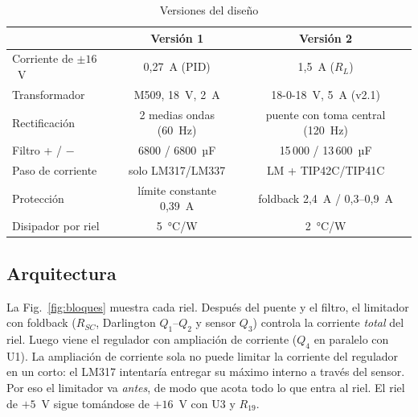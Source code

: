 \documentclass[conference]{IEEEtran}
\begin{document}
\begin{table}[htbp]
\caption{Versiones del diseño}
\label{tab:versiones}
\centering
\scriptsize\setlength{\tabcolsep}{3pt}
\begin{tabular}{@{}lcc@{}}
\toprule
 & Versión 1 & Versión 2 \\
\midrule
Corriente de $\pm16$~V & 0,27~A (PID) & 1,5~A ($R_L$) \\
Transformador & M509, 18~V, 2~A & 18-0-18~V, 5~A (v2.1) \\
Rectificación & 2 medias ondas (60~Hz) & puente con toma central (120~Hz) \\
Filtro + / $-$ & 6800 / 6800~µF & 15\,000 / 13\,600~µF \\
Paso de corriente & solo LM317/LM337 & LM + TIP42C/TIP41C \\
Protección & límite constante 0,39~A & foldback 2,4~A / 0,3--0,9~A \\
Disipador por riel & 5~°C/W & 2~°C/W \\
\bottomrule
\end{tabular}
\end{table}

\subsection{Arquitectura}
La Fig.~\ref{fig:bloques} muestra cada riel. Después del puente y el filtro, el limitador con foldback ($R_{SC}$, Darlington $Q_1$--$Q_2$ y sensor $Q_3$) controla la corriente \emph{total} del riel. Luego viene el regulador con ampliación de corriente ($Q_4$ en paralelo con U1). La ampliación de corriente sola no puede limitar la corriente del regulador en un corto: el LM317 intentaría entregar su máximo interno a través del sensor. Por eso el limitador va \emph{antes}, de modo que acota todo lo que entra al riel. El riel de $+5$~V sigue tomándose de $+16$~V con U3 y $R_{19}$.
\end{document}
